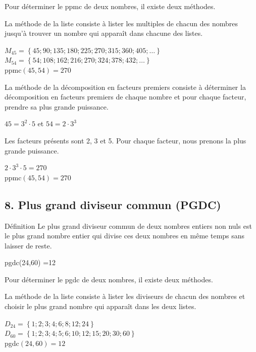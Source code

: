 \vspace{40pt}
Pour déterminer le ppmc de deux nombres, il existe deux méthodes.

\vspace{20pt}
La \textcolor{themeNO}{méthode de la liste} consiste à lister les multiples de chacun des nombres jusqu'à trouver un nombre qui apparaît dans chacune des listes.

$M_{45}=\left\{45; 90; 135; 180; 225; 270; 315; 360; 405; \ldots \right\}$\\
$M_{54}=\left\{54; 108; 162; 216; 270; 324; 378; 432; \ldots \right\}$\\
ppmc$(45,54) =270$


\vspace{20pt}
La \textcolor{themeNO}{méthode de la décomposition en facteurs premiers} consiste à déterminer la décomposition en facteurs premiers de chaque nombre et pour chaque facteur, prendre sa plus grande puissance.

$45=3^{2}\cdot 5$ \quad\quad et \quad\quad $54=2\cdot 3^3$

Les facteurs présents sont 2, 3 et 5. Pour chaque facteur, nous prenons la plus grande puissance.

$2\cdot 3^3\cdot 5=270$\\
ppmc$(45,54) =270$

\newpage
\subsection*{8.  Plus grand diviseur commun (PGDC)}

\begin{regle}{Définition}
Le \textcolor{themeNO}{plus grand diviseur commun} de deux nombres entiers non nuls est le plus grand nombre entier qui divise ces deux nombres en même temps sans laisser de reste.
\end{regle}

\begin{center}
pgdc(24,60) =12
\end{center}

\vspace{40pt}
Pour déterminer le pgdc de deux nombres, il existe deux méthodes.

\vspace{20pt}
La \textcolor{themeNO}{méthode de la liste} consiste à lister les diviseurs de chacun des nombres et choisir le plus grand nombre qui apparaît dans les deux listes.

$D_{24}=\left\{1; 2; 3; 4; 6; 8; 12; 24\right\}$\\
$D_{60}=\left\{1; 2; 3; 4; 5; 6; 10; 12; 15; 20; 30; 60\right\}$\\
pgdc$(24,60) =12$

